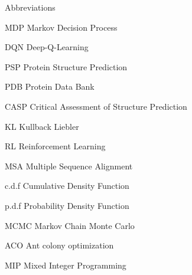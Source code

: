 
\begin{dictionary}{Abbreviations}
\item[MDP]  Markov Decision Process
\item[DQN]  Deep-Q-Learning
\item[PSP]  Protein Structure Prediction
\item[PDB]  Protein Data Bank
\item[CASP] Critical Assessment of Structure Prediction
\item[KL]   Kullback Liebler
\item[RL]   Reinforcement Learning
\item[MSA]  Multiple Sequence Alignment
\item[c.d.f] Cumulative Density Function
\item[p.d.f] Probability Density Function 
\item[MCMC] Markov Chain Monte Carlo
\item[ACO] Ant colony optimization
\item[MIP] Mixed Integer Programming 
\end{dictionary}
